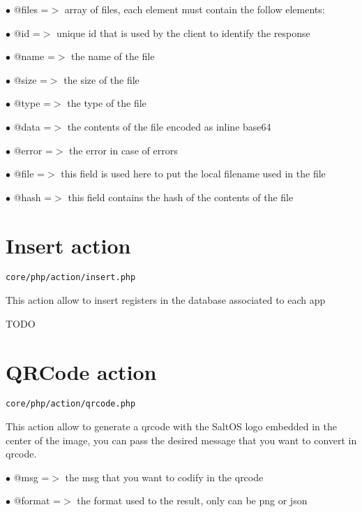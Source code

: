 \documentclass[a4paper]{book}
\begin{document}
\begin{compactitem}
\item[\color{myblue}$\bullet$] @files =$>$ array of files, each element must contain the follow elements:
\item[\color{myblue}$\bullet$] @id    =$>$ unique id that is used by the client to identify the response
\item[\color{myblue}$\bullet$] @name  =$>$ the name of the file
\item[\color{myblue}$\bullet$] @size  =$>$ the size of the file
\item[\color{myblue}$\bullet$] @type  =$>$ the type of the file
\item[\color{myblue}$\bullet$] @data  =$>$ the contents of the file encoded as inline base64
\item[\color{myblue}$\bullet$] @error =$>$ the error in case of errors
\item[\color{myblue}$\bullet$] @file  =$>$ this field is used here to put the local filename used in the file
\item[\color{myblue}$\bullet$] @hash  =$>$ this field contains the hash of the contents of the file
\end{compactitem}

\hypertarget{toc13}{}
\section{Insert action}

\begin{lstlisting}
core/php/action/insert.php
\end{lstlisting}

This action allow to insert registers in the database associated to
each app

TODO

\hypertarget{toc14}{}
\section{QRCode action}

\begin{lstlisting}
core/php/action/qrcode.php
\end{lstlisting}

This action allow to generate a qrcode with the SaltOS logo embedded
in the center of the image, you can pass the desired message that you
want to convert in qrcode.

\begin{compactitem}
\item[\color{myblue}$\bullet$] @msg    =$>$ the msg that you want to codify in the qrcode
\item[\color{myblue}$\bullet$] @format =$>$ the format used to the result, only can be png or json
\end{compactitem}
\end{document}
